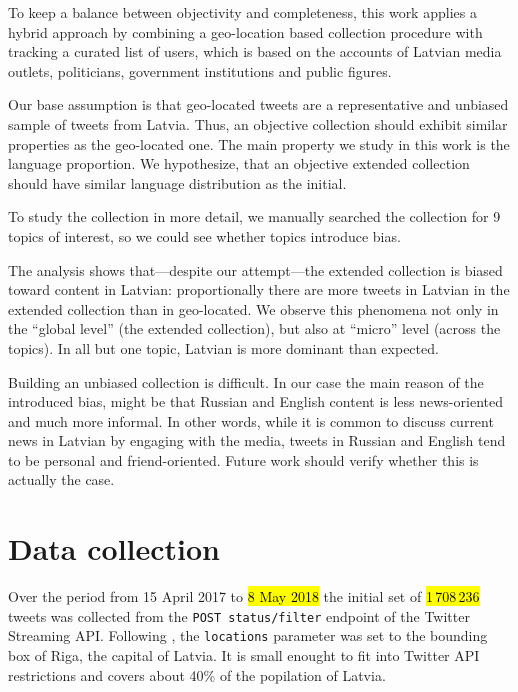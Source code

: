 \documentclass{IOS-Book-Article}
\begin{document}
To keep a balance between objectivity and completeness, this work applies a hybrid approach by combining a geo-location based collection procedure with tracking a curated list of users, which is based on the accounts of Latvian media outlets, politicians, government institutions and public figures.

Our base assumption is that geo-located tweets are a representative and unbiased sample of tweets from Latvia. Thus, an objective collection should exhibit similar properties as the geo-located one. The main property we study in this work is the language proportion. We hypothesize, that an objective extended collection should have similar language distribution as the initial.

To study the collection in more detail, we manually searched the collection for 9 topics of interest, so we could see whether topics introduce bias.


The analysis shows that---despite our attempt---the extended collection is biased toward content in Latvian: proportionally there are more tweets in Latvian in the extended collection than in geo-located. We observe this phenomena not only in the ``global level'' (the extended collection), but also at ``micro'' level (across the topics). In all but one topic, Latvian is more dominant than expected.


Building an unbiased collection is difficult.  In our case the main reason of the introduced bias, might be that Russian and English content is less news-oriented and much more informal. In other words, while it is common to discuss current news in Latvian by engaging with the media, tweets in Russian and English tend to be personal and friend-oriented. Future work should verify whether this is actually the case.

\section{Data collection}
\label{sec:data-collection}

Over the period from 15 April 2017 to \hl{8 May 2018} the initial set of \hl{1\,708\,236} tweets was collected from the \texttt{POST status/filter} endpoint of the Twitter Streaming API.%
%
%
Following \cite{milajevs:2017:BUCC}, the \texttt{locations} parameter was set to the bounding box of Riga, the capital of Latvia. It is small enought to fit into Twitter API restrictions and covers about 40\% of the popilation of Latvia.%
%
\end{document}
